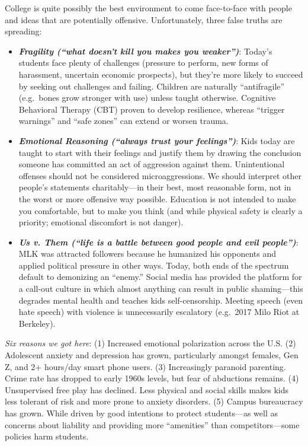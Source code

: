 \documentclass[
]{article}
\begin{document}
College is quite possibly the best environment to come face-to-face with
people and ideas that are potentially offensive. Unfortunately, three
false truths are spreading:

\begin{itemize}
\item
  \textbf{\emph{Fragility (``what doesn't kill you makes you
  weaker'')}}: Today's students face plenty of challenges (pressure to
  perform, new forms of harassment, uncertain economic prospects), but
  they're more likely to succeed by seeking out challenges and failing.
  Children are naturally ``antifragile'' (e.g.~bones grow stronger with
  use) unless taught otherwise. Cognitive Behavioral Therapy (CBT)
  proven to develop resilience, whereas ``trigger warnings'' and ``safe
  zones'' can extend or worsen trauma.
\item
  \textbf{\emph{Emotional Reasoning (``always trust your feelings'')}}:
  Kids today are taught to start with their feelings and justify them by
  drawing the conclusion someone has committed an act of aggression
  against them. Unintentional offenses should not be considered
  microaggressions. We should interpret other people's statements
  charitably---in their best, most reasonable form, not in the worst or
  more offensive way possible. Education is not intended to make you
  comfortable, but to make you think (and while physical safety is
  clearly a priority; emotional discomfort is not danger).
\item
  \textbf{\emph{Us v. Them (``life is a battle between good people and
  evil people'')}}: MLK was attracted followers because he humanized his
  opponents and applied political pressure in other ways. Today, both
  ends of the spectrum default to demonizing an ``enemy.'' Social media
  has provided the platform for a call-out culture in which almost
  anything can result in public shaming---this degrades mental health
  and teaches kids self-censorship. Meeting speech (even hate speech)
  with violence is unnecessarily escalatory (e.g.~2017 Milo Riot at
  Berkeley).
\end{itemize}

\emph{Six reasons we got here}: (1) Increased emotional polarization
across the U.S. (2) Adolescent anxiety and depression has grown,
particularly amongst females, Gen Z, and 2+ hours/day smart phone users.
(3) Increasingly paranoid parenting. Crime rate has dropped to early
1960s levels, but fear of abductions remains. (4) Unsupervised free play
has declined. Less physical and social skills makes kids less tolerant
of risk and more prone to anxiety disorders. (5) Campus bureaucracy has
grown. While driven by good intentions to protect students---as well as
concerns about liability and providing more ``amenities'' than
competitors---some policies harm students.
\end{document}
